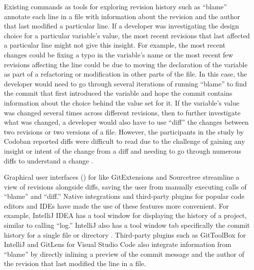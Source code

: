 Existing  commands as tools for exploring revision history such 
as ``blame'' \cite{gitblame} annotate each line in a file with information about the revision 
and the author that last modified a particular line.
If a developer was investigating the design choice for a particular variable's value, 
the most recent revisions that last affected a particular line might not give this insight.
For example, the most recent changes could be fixing a typo in the variable's name or the most recent 
few revisions affecting the line could be due to moving the declaration of the variable as part 
of a refactoring or modification in other parts of the file.
In this case, the developer would need to go through several iterations of running ``blame'' 
to find the commit that first introduced the variable and hope the commit contains information 
about the choice behind the value set for it.
If the variable's value was changed several times across different revisions, 
then to further investigate what was changed, 
a developer would also have to use  ``diff'' \cite{gitdiff}  the 
changes between two revisions or two versions of a file.
However, the participants in the study by Codoban \etal reported diffs were difficult 
to read due to the challenge of gaining any insight or intent of the change from a diff 
and needing to go through numerous diffs to understand a change \cite{codoban_software_2015}.

Graphical user interfaces () for  like GitExtensions \cite{gitextensions} 
and Sourcetree \cite{sourcetree} streamline a view of revisions alongside diffs, 
saving the user from manually executing calls of  ``blame'' and ``diff.'' 
Native  integrations and third-party plugins for popular code editors and IDEs 
have made the use of these  features more convenient. 
For example, IntelliJ IDEA \cite{intellij} has a tool window for displaying the  
history of a project, similar to calling  ``log.''
IntelliJ also has a tool window tab specifically  the commit history 
for a single file or directory \cite{intellij-showhistory}.
Third-party plugins such as GitToolBox \cite{gittoolbox} for IntelliJ and GitLens \cite{gitlens} 
for Visual Studio Code also integrate information from  ``blame'' by directly 
inlining a preview of the commit message and the author of the revision that last modified the line in a file.

